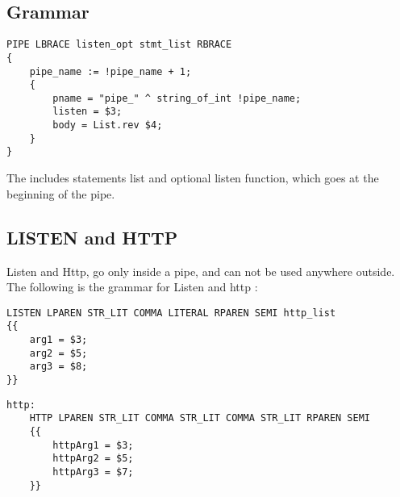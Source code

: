 \documentclass[./Report_main.tex]{subfiles}
\begin{document}
\subsection{Grammar}
\begin{lstlisting}
PIPE LBRACE listen_opt stmt_list RBRACE
{ 
    pipe_name := !pipe_name + 1;
    { 
    	pname = "pipe_" ^ string_of_int !pipe_name;
    	listen = $3;
    	body = List.rev $4;
    }
}
\end{lstlisting}

The includes statements list and optional listen function, which goes at the beginning of the pipe.

\subsection{ LISTEN and HTTP}
Listen and Http, go only inside a pipe, and can not be used anywhere outside. The following is the grammar for Listen and http : 



\begin{lstlisting}
LISTEN LPAREN STR_LIT COMMA LITERAL RPAREN SEMI http_list
{{
	arg1 = $3;
	arg2 = $5;
	arg3 = $8;
}}
\end{lstlisting}

\begin{lstlisting}
http:
    HTTP LPAREN STR_LIT COMMA STR_LIT COMMA STR_LIT RPAREN SEMI    
    {{ 
        httpArg1 = $3; 
        httpArg2 = $5;
        httpArg3 = $7;
    }}

\end{lstlisting}
\end{document}
